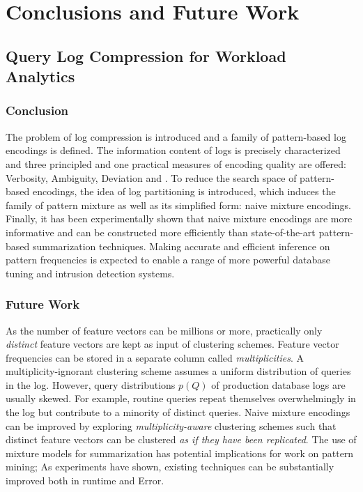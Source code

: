 \chapter{Conclusions and Future Work}\label{chapter:conclusionsandfuturework}

\section{Query Log Compression for Workload Analytics}
\subsection{Conclusion}
The problem of log compression is introduced and a family of pattern-based log encodings is defined. 
The information content of logs is precisely characterized and three principled and one practical measures of encoding quality are offered: Verbosity, Ambiguity, Deviation and \errorname. 
To reduce the search space of pattern-based encodings, the idea of log partitioning is introduced, which induces the family of pattern mixture as well as its simplified form: naive mixture encodings. 
Finally, it has been experimentally shown that naive mixture encodings are more informative and can be constructed more efficiently than state-of-the-art pattern-based summarization techniques. 
Making accurate and efficient inference on pattern frequencies is expected to enable a range of more powerful database tuning and intrusion detection systems.

\subsection{Future Work}
As the number of feature vectors can be millions or more, practically only \textit{distinct} feature vectors are kept as input of clustering schemes.
Feature vector frequencies can be stored in a separate column called \textit{multiplicities}.
A multiplicity-ignorant clustering scheme assumes a uniform distribution of queries in the log.
However, query distributions $p(Q)$ of production database logs are usually skewed.
For example, routine queries repeat themselves overwhelmingly in the log but contribute to a minority of distinct queries.
Naive mixture encodings can be improved by exploring \textit{multiplicity-aware} clustering schemes such that distinct feature vectors can be clustered \textit{as if they have been replicated}.
The use of mixture models for summarization has potential implications for work on pattern mining; As experiments have shown, existing techniques can be substantially improved both in runtime and Error.

